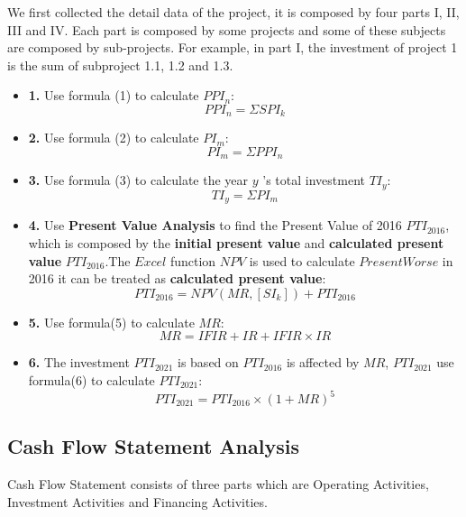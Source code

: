 \documentclass[12pt]{article}
\begin{document}
We first collected the detail data of the project, it is composed by four parts I, II, III and IV. Each part is composed by some projects and some of these subjects are composed by sub-projects. For example, in part I, the investment of project 1 is the sum of subproject 1.1, 1.2 and 1.3.
\begin{itemize}
  \item {\bfseries 1.} Use formula (1) to calculate $PPI_n$:
        \begin{equation}\label{1}
            PPI_n=\varSigma SPI_k
        \end{equation}
  \item {\bfseries 2.} Use formula (2) to calculate $PI_m$:
        \begin{equation}\label{2}
            PI_m=\varSigma PPI_n
        \end{equation}
  \item {\bfseries 3.} Use formula (3) to calculate the year $y$ 's total investment $TI_y$:
        \begin{equation}\label{3}
            TI_y=\varSigma PI_m
        \end{equation}
  \item {\bfseries 4.} Use {\bfseries Present Value Analysis} to find the Present Value of 2016 $PTI_{2016}$, which is composed by the {\bfseries initial present value} and {\bfseries calculated present value} $PTI_{2016}$.The $Excel$ function $NPV$ is used to calculate $Present Worse$ in 2016 it can be treated as {\bfseries calculated present value}:
        \begin{equation}\label{4}
         PTI_{2016}=NPV\left( MR,\left[ SI_k \right] \right) +PTI_{2016}
         \end{equation}
  \item {\bfseries 5.} Use formula(5) to calculate $MR$:
        \begin{equation}\label{5}
          MR=IFIR+IR+IFIR\times IR
        \end{equation}
  \item {\bfseries 6.} The investment $PTI_{2021}$ is based on $PTI_{2016}$ is affected by $MR$, $PTI_{2021}$ use formula(6) to calculate $PTI_{2021}$:
        \begin{equation}\label{6}
          PTI_{2021}=PTI_{2016}\times \left( 1+MR \right) ^5
        \end{equation}
\end{itemize}

\subsection{Cash Flow Statement Analysis}
Cash Flow Statement consists of three parts which are Operating Activities, Investment Activities and Financing Activities.
\end{document}
